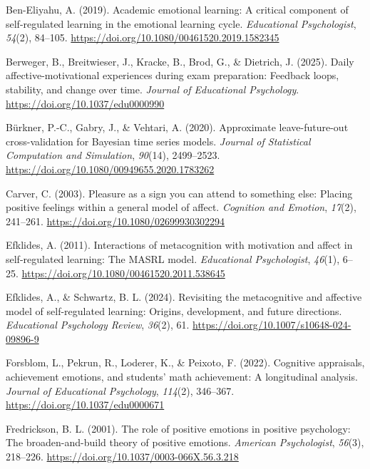 \documentclass[
  man,
  floatsintext,
  longtable,
  nolmodern,
  notxfonts,
  notimes,
  colorlinks=true,linkcolor=blue,citecolor=blue,urlcolor=blue]{apa7}
\newlength{\cslhangindent}
\newenvironment{CSLReferences}[2] %
 {\begin{list}{}{%
  \setlength{\itemindent}{0pt}
  \setlength{\leftmargin}{0pt}
  \setlength{\parsep}{0pt}
  \ifodd #1
   \setlength{\leftmargin}{\cslhangindent}
   \setlength{\itemindent}{-1\cslhangindent}
  \fi
  \setlength{\itemsep}{#2\baselineskip}}}
 {\end{list}}
\begin{document}
\label{refs}
\begin{CSLReferences}{1}{0}
Ben-Eliyahu, A. (2019). Academic emotional learning: A critical
component of self-regulated learning in the emotional learning cycle.
\emph{Educational Psychologist}, \emph{54}(2), 84--105.
\url{https://doi.org/10.1080/00461520.2019.1582345}

Berweger, B., Breitwieser, J., Kracke, B., Brod, G., \& Dietrich, J.
(2025). Daily affective-motivational experiences during exam
preparation: {Feedback} loops, stability, and change over time.
\emph{Journal of Educational Psychology}.
\url{https://doi.org/10.1037/edu0000990}

Bürkner, P.-C., Gabry, J., \& Vehtari, A. (2020). Approximate
leave-future-out cross-validation for {Bayesian} time series models.
\emph{Journal of Statistical Computation and Simulation}, \emph{90}(14),
2499--2523. \url{https://doi.org/10.1080/00949655.2020.1783262}

Carver, C. (2003). Pleasure as a sign you can attend to something else:
{Placing} positive feelings within a general model of affect.
\emph{Cognition and Emotion}, \emph{17}(2), 241--261.
\url{https://doi.org/10.1080/02699930302294}

Efklides, A. (2011). Interactions of metacognition with motivation and
affect in self-regulated learning: The {MASRL} model. \emph{Educational
Psychologist}, \emph{46}(1), 6--25.
\url{https://doi.org/10.1080/00461520.2011.538645}

Efklides, A., \& Schwartz, B. L. (2024). Revisiting the metacognitive
and affective model of self-regulated learning: Origins, development,
and future directions. \emph{Educational Psychology Review},
\emph{36}(2), 61. \url{https://doi.org/10.1007/s10648-024-09896-9}

Forsblom, L., Pekrun, R., Loderer, K., \& Peixoto, F. (2022). Cognitive
appraisals, achievement emotions, and students' math achievement: {A}
longitudinal analysis. \emph{Journal of Educational Psychology},
\emph{114}(2), 346--367. \url{https://doi.org/10.1037/edu0000671}

Fredrickson, B. L. (2001). The role of positive emotions in positive
psychology: {The} broaden-and-build theory of positive emotions.
\emph{American Psychologist}, \emph{56}(3), 218--226.
\url{https://doi.org/10.1037/0003-066X.56.3.218}


\end{CSLReferences}
\end{document}
